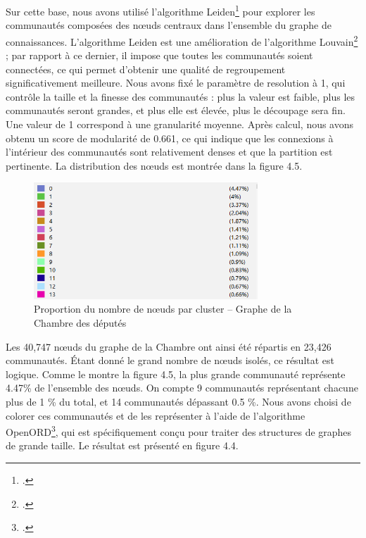 \documentclass[a4paper,twoside,12pt]{book}
\begin{document}
Sur cette base, nous avons utilisé l'algorithme Leiden\footcite{traag2019} pour explorer les communautés composées des nœuds centraux dans l'ensemble du graphe de connaissances. L'algorithme Leiden est une amélioration de l'algorithme Louvain\footcite{blondel2008} ; par rapport à ce dernier, il impose que toutes les communautés soient connectées, ce qui permet d'obtenir une qualité de regroupement significativement meilleure. Nous avons fixé le paramètre de resolution à 1, qui contrôle la taille et la finesse des communautés : plus la valeur est faible, plus les communautés seront grandes, et plus elle est élevée, plus le découpage sera fin. Une valeur de 1 correspond à une granularité moyenne. Après calcul, nous avons obtenu un score de modularité de 0.661, ce qui indique que les connexions à l'intérieur des communautés sont relativement denses et que la partition est pertinente. La distribution des nœuds est montrée dans la figure 4.5.

\begin{figure}
\centering %
\includegraphics[width=0.75\textwidth]{img/chambre_cluster.png}
\caption{Proportion du nombre de nœuds par cluster – Graphe de la Chambre des députés}
\end{figure}

Les 40,747 nœuds du graphe de la Chambre ont ainsi été répartis en 23,426 communautés. Étant donné le grand nombre de nœuds isolés, ce résultat est logique. Comme le montre la figure 4.5, la plus grande communauté représente 4.47\% de l'ensemble des nœuds. On compte 9 communautés représentant chacune plus de 1 \% du total, et 14 communautés dépassant 0.5 \%. Nous avons choisi de colorer ces communautés et de les représenter à l'aide de l'algorithme OpenORD\footcite{martin2011}, qui est spécifiquement conçu pour traiter des structures de graphes de grande taille. Le résultat est présenté en figure 4.4.
\end{document}
